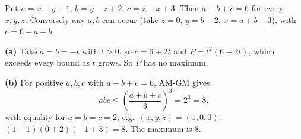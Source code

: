 Put $a=x-y+1$, $b=y-z+2$, $c=z-x+3$. Then $a+b+c=6$ for every $x,y,z$. Conversely any $a,b$ can occur (take $z=0$, $y=b-2$, $x=a+b-3$), with $c=6-a-b$.

\textbf{(a)} Take $a=b=-t$ with $t>0$, so $c=6+2t$ and $P=t^2(6+2t)$, which exceeds every bound as $t$ grows. So $P$ has no maximum.

\textbf{(b)} For positive $a,b,c$ with $a+b+c=6$, AM-GM gives
\[
abc\le\left(\dfrac{a+b+c}{3}\right)^3=2^3=8,
\]
with equality for $a=b=c=2$, e.g.\ $(x,y,z)=(1,0,0)$: $(1+1)(0+2)(-1+3)=8$. The maximum is $\boxed{8}$.

